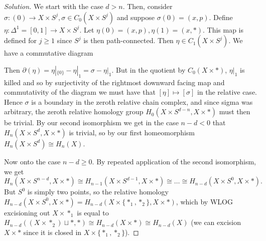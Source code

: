 \begin{proof}[Solution]
We start with the case $d>n$. Then, consider $\sigma: (0)\to X\times S^j, \sigma \in C_0(X\times S^j)$ and suppose $\sigma(0) = (x, p)$. Define $\eta: \Delta^1 = [0, 1] \to X\times S^j$. Let $\eta(0) = (x, p), \eta(1) = (x, *)$. This map is defined for $j\geq 1$ since $S^j$ is then path-connected. Then $\eta \in C_1(X \times S^j)$. We have a commutative diagram
\begin{center}
\end{center}
Then $\partial(\eta) = \eta|_{\{0\}} - \eta|_{{1}} = \sigma - \eta|_{{1}}$. But in the quotient by $C_0(X\times *)$, $\eta|_{{1}}$ is killed and so by surjectivity of the rightmost downward facing map and commutativity of the diagram we must have that $[\eta] \mapsto [\sigma]$ in the relative case. Hence $\sigma$ is a boundary in the zeroth relative chain complex, and since sigma was arbitrary, the zeroth relative homology group $H_0(X\times S^{d-n}, X\times *)$ must then be trivial. By our second isomorphism we get in the case $n-d <0$ that $H_n(X\times S^d, X\times *)$ is trivial, so by our first homeomorphism $H_n(X\times S^d) \cong H_n(X)$.



Now onto the case $n-d\geq 0$. By repeated application of the second isomorphism, we get
\[
H_n(X \times S^{n-d}, X \times *) \cong H_{n-1}(X \times S^{d-1}, X \times *) \cong \ldots \cong H_{n-d}(X \times S^{0}, X \times *).
\]
But $S^0$ is simply two points, so the relative homology $H_{n-d}(X \times S^{0}, X \times *) = H_{n-d}(X \times \{*_1, *_2\}, X \times *)$, which by WLOG excisioning out $X\times *_1$ is equal to $H_{n-d}((X \times *_2) \sqcup *, *) \cong H_{n-d}(X\times *) \cong H_{n-d}(X)$ (we can excision $X\times *$ since it is closed in $X\times \{*_1, *_2\}$).
\end{proof}


\newpage

